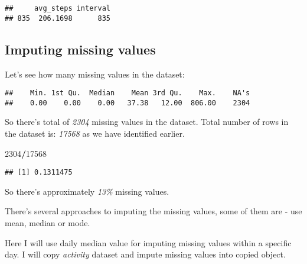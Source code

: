 \documentclass[
]{article}
\newenvironment{Shaded}{\begin{snugshade}}{\end{snugshade}}
\newcommand{\DecValTok}[1]{\textcolor[rgb]{0.00,0.00,0.81}{#1}}
\newcommand{\FunctionTok}[1]{\textcolor[rgb]{0.13,0.29,0.53}{\textbf{#1}}}
\newcommand{\NormalTok}[1]{#1}
\newcommand{\SpecialCharTok}[1]{\textcolor[rgb]{0.81,0.36,0.00}{\textbf{#1}}}
\begin{document}
\begin{verbatim}
##     avg_steps interval
## 835  206.1698      835
\end{verbatim}

\subsection{Imputing missing values}\label{imputing-missing-values}

Let's see how many missing values in the dataset:

\begin{Shaded}
\end{Shaded}

\begin{verbatim}
##    Min. 1st Qu.  Median    Mean 3rd Qu.    Max.    NA's 
##    0.00    0.00    0.00   37.38   12.00  806.00    2304
\end{verbatim}

So there's total of \emph{2304} missing values in the dataset. Total
number of rows in the dataset is: \emph{17568} as we have identified
earlier.

\begin{Shaded}
\begin{Highlighting}[]
\DecValTok{2304}\SpecialCharTok{/}\DecValTok{17568}
\end{Highlighting}
\end{Shaded}

\begin{verbatim}
## [1] 0.1311475
\end{verbatim}

So there's approximately \emph{13\%} missing values.

There's several approaches to imputing the missing values, some of them
are - use mean, median or mode.

Here I will use daily median value for imputing missing values within a
specific day. I will copy \emph{activity} dataset and impute missing
values into copied object.
\end{document}
